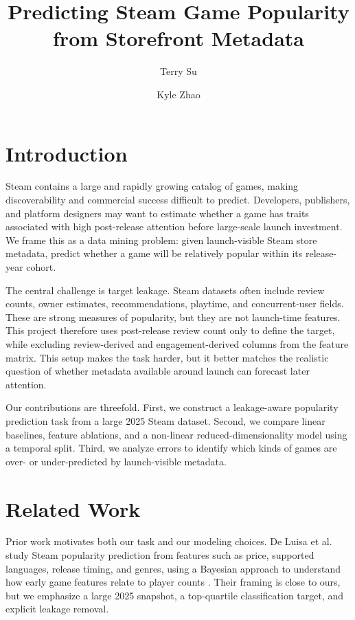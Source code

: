 \documentclass[11pt,sigconf,nonacm]{acmart}
\title{Predicting Steam Game Popularity from Storefront Metadata}
\author{Terry Su}
\affiliation{
  \institution{University of California San Diego}
  \city{La Jolla}
  \state{California}
  \country{USA}
}
\author{Kyle Zhao}
\affiliation{
  \institution{University of California San Diego}
  \city{La Jolla}
  \state{California}
  \country{USA}
}
\begin{document}
\maketitle

\section{Introduction}

Steam contains a large and rapidly growing catalog of games, making discoverability and commercial success difficult to predict. Developers, publishers, and platform designers may want to estimate whether a game has traits associated with high post-release attention before large-scale launch investment. We frame this as a data mining problem: given launch-visible Steam store metadata, predict whether a game will be relatively popular within its release-year cohort.

The central challenge is target leakage. Steam datasets often include review counts, owner estimates, recommendations, playtime, and concurrent-user fields. These are strong measures of popularity, but they are not launch-time features. This project therefore uses post-release review count only to define the target, while excluding review-derived and engagement-derived columns from the feature matrix. This setup makes the task harder, but it better matches the realistic question of whether metadata available around launch can forecast later attention.

Our contributions are threefold. First, we construct a leakage-aware popularity prediction task from a large 2025 Steam dataset. Second, we compare linear baselines, feature ablations, and a non-linear reduced-dimensionality model using a temporal split. Third, we analyze errors to identify which kinds of games are over- or under-predicted by launch-visible metadata.

\section{Related Work}

Prior work motivates both our task and our modeling choices. De Luisa et al. study Steam popularity prediction from features such as price, supported languages, release timing, and genres, using a Bayesian approach to understand how early game features relate to player counts \citep{deluisa2021steam}. Their framing is close to ours, but we emphasize a large 2025 snapshot, a top-quartile classification target, and explicit leakage removal.
\end{document}
